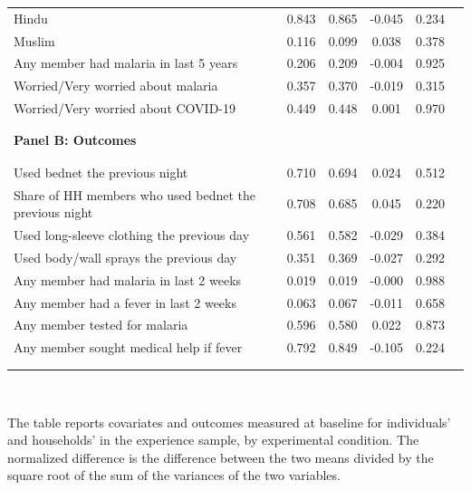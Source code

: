 {\begin{tabular}{lccccc}
Hindu & 0.843 & 0.865 & -0.045 & 0.234 & \\
Muslim & 0.116 & 0.099 & 0.038 & 0.378 & \\
Any member had malaria in last 5 years & 0.206 & 0.209 & -0.004 & 0.925 & \\
Worried/Very worried about malaria & 0.357 & 0.370 & -0.019 & 0.315 & \\
Worried/Very worried about COVID-19 & 0.449 & 0.448 & 0.001 & 0.970 & \\
\hline \hline \\[-5.5ex] &  &  &  &  & \\
\textbf{Panel B: Outcomes} &  &  &  &  & \\
 &  &  &  &  & \\[-5ex]\\
Used bednet the previous night & 0.710 & 0.694 & 0.024 & 0.512 & \\
Share of HH members who used bednet the previous night & 0.708 & 0.685 & 0.045 & 0.220 & \\
Used long-sleeve clothing the previous day & 0.561 & 0.582 & -0.029 & 0.384 & \\
Used body/wall sprays the previous day & 0.351 & 0.369 & -0.027 & 0.292 & \\
Any member had malaria in last 2 weeks & 0.019 & 0.019 & -0.000 & 0.988 & \\
Any member had a fever in last 2 weeks & 0.063 & 0.067 & -0.011 & 0.658 & \\
Any member tested for malaria & 0.596 & 0.580 & 0.022 & 0.873 & \\
Any member sought medical help if fever & 0.792 & 0.849 & -0.105 & 0.224 & \\
\hline \\[-5.1ex] &  &  &  &  & \\
\hline\end{tabular}
}%
\\
\begin{minipage}{1\linewidth}
  \scriptsize  The table reports covariates and outcomes measured at baseline for individuals' and households' in the experience sample, by experimental condition. The normalized difference is the difference between the two means divided by the square root of the sum of the variances of the two variables.\\
\end{minipage}

